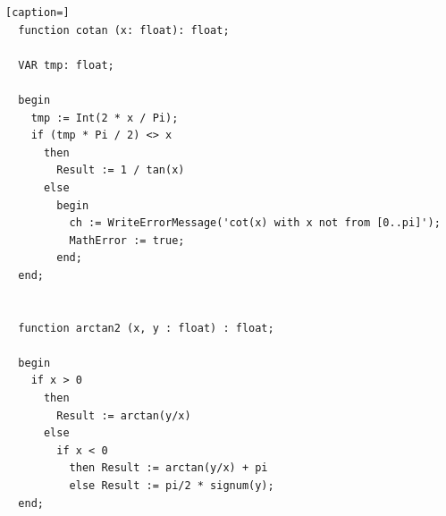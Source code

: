 \begin{refsection}
\begin{lstlisting}[caption=]
  function cotan (x: float): float;

  VAR tmp: float;

  begin
    tmp := Int(2 * x / Pi);
    if (tmp * Pi / 2) <> x
      then
        Result := 1 / tan(x)
      else
        begin
          ch := WriteErrorMessage('cot(x) with x not from [0..pi]');
          MathError := true;
        end;
  end;


  function arctan2 (x, y : float) : float;

  begin
    if x > 0
      then
        Result := arctan(y/x)
      else
        if x < 0
          then Result := arctan(y/x) + pi
          else Result := pi/2 * signum(y);
  end;
\end{lstlisting}

\printbibliography[heading=subbibliography]
\end{refsection}

